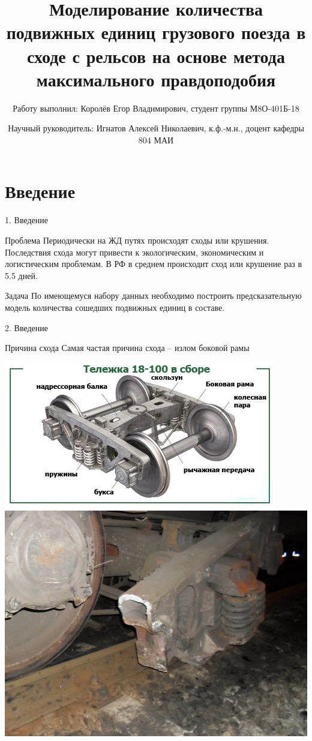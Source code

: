 \documentclass[aspectratio=169]{beamer}
\title[Моделирование количества подвижных единиц в сходе с рельсов]{Моделирование количества подвижных единиц грузового поезда в сходе с рельсов на основе метода максимального правдоподобия}
\author[Е.В.Королёв \and А.Н.Игнатов]{Работу выполнил: Королёв Егор Владимирович, студент группы М8О-401Б-18 \and Научный руководитель: Игнатов Алексей Николаевич, к.ф.-м.н., доцент кафедры 804 МАИ}
\institute[НИУ МАИ]{Московский авиационный институт (НИУ)}
\date{}
\begin{document}
    \begin{frame}
        \maketitle
    \end{frame}


    \section{Введение}
    \begin{frame}{1. Введение}
        \begin{block}{Проблема}
            Периодически на ЖД путях происходят сходы или крушения. Последствия схода могут привести к экологическим, экономическим и логистическим проблемам. В РФ в среднем происходит сход или крушение раз в 5.5 дней.
        \end{block}
    
        \begin{block}{Задача}
            По имеющемуся набору данных необходимо построить предсказательную модель количества сошедших подвижных единиц в составе.
        \end{block}
    \end{frame}

    \begin{frame}{2. Введение}
        \begin{block}{Причина схода}
            Самая частая причина схода -- излом боковой рамы
        \end{block}
    
        \centering
        \includegraphics[width=0.55\linewidth]{src/тележка_в_сборе.png}
        \includegraphics[width=0.4\linewidth]{src/излом.png}
    \end{frame}
\end{document}
